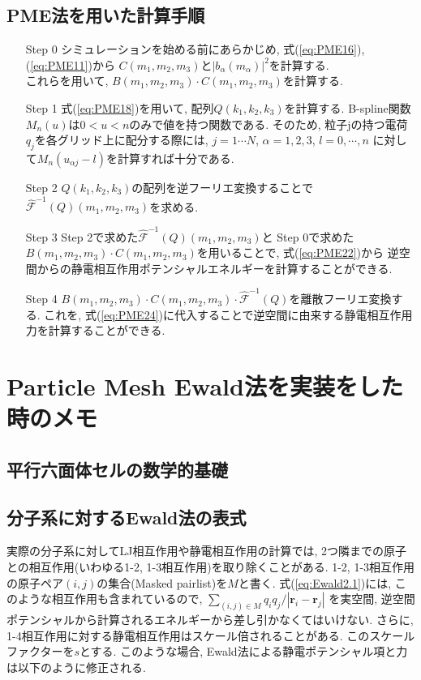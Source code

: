 \subsection{PME法を用いた計算手順}
\begin{enumerate}
 \setlength{\leftskip}{0.4cm}
 \item[Step 0]
	      シミュレーションを始める前にあらかじめ, 式(\ref{eq:PME16}),(\ref{eq:PME11})から
	      $C(m_{1}, m_{2}, m_{3})$と$|b_{\alpha}(m_{\alpha})|^{2}$を計算する. \\
	      これらを用いて, $B(m_{1}, m_{2}, m_{3}) \cdot C(m_{1}, m_{2}, m_{3})$を計算する.
 \item[Step 1]
	      式(\ref{eq:PME18})を用いて, 配列$Q(k_{1}, k_{2}, k_{3})$を計算する.
	      B-spline関数 $M_{n}(u)$は$0<u<n$のみで値を持つ関数である. そのため,
	      粒子jの持つ電荷$q_{j}$を各グリッド上に配分する際には,
	      $j=1 \cdots N$, $\alpha=1,2,3$, $l=0,\cdots,n$
	      に対して$M_{n}(u_{\alpha j} - l)$を計算すれば十分である.
 \item[Step 2]
	      $Q(k_{1}, k_{2}, k_{3})$の配列を逆フーリエ変換することで$\hat{\mathcal{F}}^{-1} (Q)(m_{1}, m_{2}, m_{3})$を求める.
 \item[Step 3]
	      Step 2で求めた$\hat{\mathcal{F}}^{-1}(Q)(m_{1}, m_{2}, m_{3})$と Step 0で求めた
	      $B(m_{1}, m_{2}, m_{3}) \cdot C(m_{1}, m_{2}, m_{3})$を用いることで, 式(\ref{eq:PME22})から
	      逆空間からの静電相互作用ポテンシャルエネルギーを計算することができる.
 \item[Step 4]
	      $B(m_{1}, m_{2}, m_{3}) \cdot C(m_{1}, m_{2}, m_{3}) \cdot \hat{\mathcal{F}}^{-1}(Q)$を離散フーリエ変換する.
	      これを, 式(\ref{eq:PME24})に代入することで逆空間に由来する静電相互作用力を計算することができる.
\end{enumerate}
\clearpage

\section{Particle Mesh Ewald法を実装をした時のメモ}
\subsection{平行六面体セルの数学的基礎}

\subsection{分子系に対するEwald法の表式}
実際の分子系に対してLJ相互作用や静電相互作用の計算では,
2つ隣までの原子との相互作用(いわゆる1-2, 1-3相互作用)を取り除くことがある.
1-2, 1-3相互作用の原子ペア$(i,j)$の集合(Masked pairlist)を$M$と書く.
式(\ref{eq:Ewald2.1})には, このような相互作用も含まれているので,
$\sum_{(i,j) \in M} q_{i}q_{j} / |\bm{r}_{i} - \bm{r}_{j} |$
を実空間, 逆空間ポテンシャルから計算されるエネルギーから差し引かなくてはいけない.
さらに, 1-4相互作用に対する静電相互作用はスケール倍されることがある. このスケールファクターを$s$とする.
このような場合, Ewald法による静電ポテンシャル項と力は以下のように修正される.

